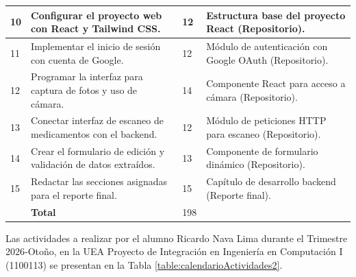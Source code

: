 {\begin{longtable}{p{} p{} p{} p{}}
10 &
Configurar el proyecto web con React y Tailwind CSS. &
12 &
Estructura base del proyecto React (Repositorio). \\
    \midrule

11 &
Implementar el inicio de sesión con cuenta de Google. &
12 &
Módulo de autenticación con Google OAuth (Repositorio). \\
    \midrule

12 &
Programar la interfaz para captura de fotos y uso de cámara. &
14 &
Componente React para acceso a cámara (Repositorio). \\
    \midrule

13 &
Conectar interfaz de escaneo de medicamentos con el backend. &
12 &
Módulo de peticiones HTTP para escaneo (Repositorio). \\
    \midrule

14 &
Crear el formulario de edición y validación de datos extraídos. &
13 &
Componente de formulario dinámico (Repositorio). \\
    \midrule
    
15 &
Redactar las secciones asignadas para el reporte final. &
15 &
Capítulo de desarrollo backend (Reporte final). \\
    \midrule

 &
\textbf{Total} &
198 &
 \\
\bottomrule
\end{longtable}
}

Las actividades a realizar por el alumno Ricardo Nava Lima durante el Trimestre 2026-Otoño, en la UEA Proyecto de Integración en Ingeniería en Computación I (1100113) se presentan en la Tabla \ref{table:calendarioActividades2}.

